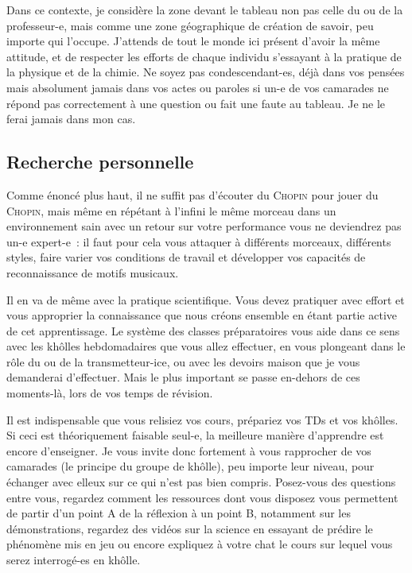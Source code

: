 \documentclass[a4paper, 12pt, final, garamond]{book}
\begin{document}
Dans ce contexte, je considère la zone devant le tableau non pas celle du ou de
la professeur-e, mais comme une zone géographique de création de savoir, peu
importe qui l'occupe. J'attends de tout le monde ici présent d'avoir la même
attitude, et de respecter les efforts de chaque individu s'essayant à la
pratique de la physique et de la chimie. Ne soyez pas condescendant-es, déjà
dans vos pensées mais absolument jamais dans vos actes ou paroles si un-e de vos
camarades ne répond pas correctement à une question ou fait une faute au
tableau. Je ne le ferai jamais dans mon cas.

\subsection{Recherche personnelle}

Comme énoncé plus haut, il ne suffit pas d'écouter du \textsc{Chopin} pour jouer
du \textsc{Chopin}, mais même en répétant à l'infini le même morceau dans un
environnement sain avec un retour sur votre performance vous ne deviendrez pas
un-e expert-e~: il faut pour cela vous attaquer à différents morceaux,
différents styles, faire varier vos conditions de travail et développer vos
capacités de reconnaissance de motifs musicaux.

Il en va de même avec la pratique scientifique. Vous devez pratiquer avec effort
et vous approprier la connaissance que nous créons ensemble en étant partie
active de cet apprentissage. Le système des classes préparatoires vous aide dans
ce sens avec les khôlles hebdomadaires que vous allez effectuer, en vous
plongeant dans le rôle du ou de la transmetteur-ice, ou avec les devoirs maison
que je vous demanderai d'effectuer. Mais le plus important se passe en-dehors de
ces moments-là, lors de vos temps de révision.

Il est indispensable que vous relisiez vos cours, prépariez vos TDs et vos
khôlles. Si ceci est théoriquement faisable seul-e, la meilleure manière
d'apprendre est encore d'enseigner. Je vous invite donc fortement à vous
rapprocher de vos camarades (le principe du groupe de khôlle), peu importe leur
niveau, pour échanger avec elleux sur ce qui n'est pas bien compris. Posez-vous
des questions entre vous, regardez comment les ressources dont vous disposez
vous permettent de partir d'un point A de la réflexion à un point B, notamment
sur les démonstrations, regardez des vidéos sur la science en essayant de
prédire le phénomène mis en jeu ou encore expliquez à votre chat le cours sur
lequel vous serez interrogé-es en khôlle.
\end{document}
